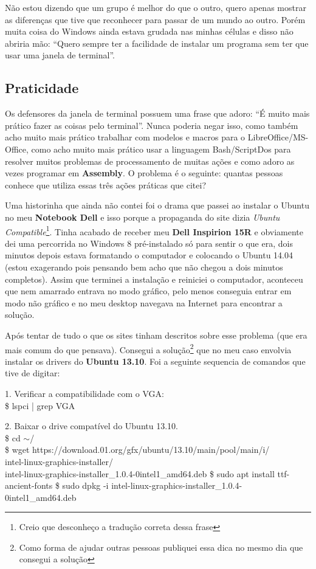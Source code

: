 Não estou dizendo que um grupo é melhor do que o outro, quero apenas mostrar as diferenças que tive que reconhecer para passar de um mundo ao outro. Porém muita coisa do Windows ainda estava grudada nas minhas células e disso não abriria mão: ``Quero sempre ter a facilidade de instalar um programa sem ter que usar uma janela de terminal''.

\subsection{Praticidade}
Os defensores da janela de terminal possuem uma frase que adoro: ``É muito mais prático fazer as coisas pelo terminal''. Nunca poderia negar isso, como também acho muito mais prático trabalhar com modelos e macros para o LibreOffice/MS-Office, como acho muito mais prático usar a linguagem Bash/ScriptDos para resolver muitos problemas de processamento de muitas ações e como adoro as vezes programar em \textbf{Assembly}. O problema é o seguinte: quantas pessoas conhece que utiliza essas três ações práticas que citei?

Uma historinha que ainda não contei foi o drama que passei ao instalar o Ubuntu no meu \textbf{Notebook Dell} e isso porque a propaganda do site dizia \textit{Ubuntu Compatible}\footnote{Creio que desconheço a tradução correta dessa frase}. Tinha acabado de receber meu \textbf{Dell Inspirion 15R} e obviamente dei uma percorrida no Windows 8 pré-instalado só para sentir o que era, dois minutos depois estava formatando o computador e colocando o Ubuntu 14.04 (estou exagerando pois pensando bem acho que não chegou a dois minutos completos). Assim que terminei a instalação e reiniciei o computador, aconteceu que nem amarrado entrava no modo gráfico, pelo menos conseguia entrar em modo não gráfico e no meu desktop navegava na Internet para encontrar a solução.

Após tentar de tudo o que os sites tinham descritos sobre esse problema (que era mais comum do que pensava). Consegui a solução\footnote{Como forma de ajudar outras pessoas publiquei essa dica no mesmo dia que consegui a solução} que no meu caso envolvia instalar os drivers do \textbf{Ubuntu 13.10}. Foi a seguinte sequencia de comandos que tive de digitar:

1. Verificar a compatibilidade com o VGA: \\
{\ttfamily\$ lspci | grep VGA}

2. Baixar o drive compatível do Ubuntu 13.10. \\
{\ttfamily\$ cd $\sim$/ \\
\$ wget https://download.01.org/gfx/ubuntu/13.10/main/pool/main/i/ \\ intel-linux-graphics-installer/ \\ intel-linux-graphics-installer\_1.0.4-0intel1\_amd64.deb
\$ sudo apt install ttf-ancient-fonts
\$ sudo dpkg -i intel-linux-graphics-installer\_1.0.4-0intel1\_amd64.deb}

